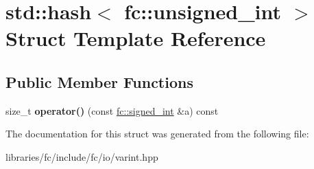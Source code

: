 \hypertarget{structstd_1_1hash_3_01fc_1_1unsigned__int_01_4}{}\section{std\+:\+:hash$<$ fc\+:\+:unsigned\+\_\+int $>$ Struct Template Reference}
\label{structstd_1_1hash_3_01fc_1_1unsigned__int_01_4}
\subsection*{Public Member Functions}
\begin{DoxyCompactItemize}
\item 
\mbox{\label{structstd_1_1hash_3_01fc_1_1unsigned__int_01_4_a7ef1bff9e387b3d3fc97f1c11803b483}} 
size\+\_\+t {\bfseries operator()} (const \mbox{\hyperlink{structfc_1_1signed__int}{fc\+::signed\+\_\+int}} \&a) const
\end{DoxyCompactItemize}


The documentation for this struct was generated from the following file\+:\begin{DoxyCompactItemize}
\item 
libraries/fc/include/fc/io/varint.\+hpp\end{DoxyCompactItemize}
